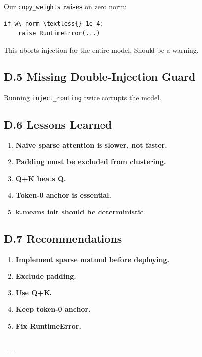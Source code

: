 Our \texttt{copy\_weights} \textbf{raises} on zero norm:

\begin{lstlisting}
if w\_norm \textless{} 1e-4:
    raise RuntimeError(...)
\end{lstlisting}

This aborts injection for the entire model. Should be a warning.

\subsection{D.5 Missing Double-Injection Guard}

Running \texttt{inject\_routing} twice corrupts the model.

\subsection{D.6 Lessons Learned}

\begin{enumerate}
\item \textbf{Naive sparse attention is slower, not faster.}
\item \textbf{Padding must be excluded from clustering.}
\item \textbf{Q+K beats Q.}
\item \textbf{Token-0 anchor is essential.}
\item \textbf{k-means init should be deterministic.}

\end{enumerate}
\subsection{D.7 Recommendations}

\begin{enumerate}
\item \textbf{Implement sparse matmul before deploying.}
\item \textbf{Exclude padding.}
\item \textbf{Use Q+K.}
\item \textbf{Keep token-0 anchor.}
\item \textbf{Fix RuntimeError.}
\end{enumerate}
\begin{lstlisting}

---
\end{lstlisting}


